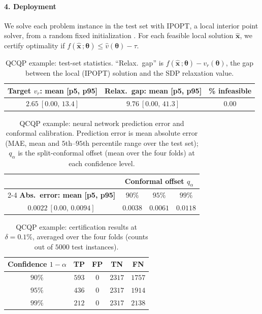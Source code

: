 \documentclass[10pt]{article} %
\theoremstyle{plain}
\theoremstyle{definition}
\theoremstyle{remark}
\begin{document}
\paragraph{4. Deployment}

We solve each problem instance in the test set with IPOPT, a local interior point solver, from a random fixed initialization \citep{wachter2006implementation}. For each feasible local solution $\hat{\mathbf{x}}$, we certify optimality if $f(\hat{\mathbf{x}}\,;\bm{\theta}) \leq \hat{v}(\bm{\theta}) - \tau$.

\begin{table}[H]
\centering
\caption{QCQP example: test-set statistics. ``Relax.\ gap'' is $f(\hat{\mathbf{x}}\,;\bm{\theta}) - v_r(\bm{\theta})$, the gap between the local (IPOPT) solution and the SDP relaxation value.}
\begin{tabular}{ccc}
\toprule
\textbf{Target } $v_r$\textbf{: mean [p5, p95]} & \textbf{Relax.\ gap: mean [p5, p95]} & \textbf{\% infeasible} \\
\midrule
$2.65\ [0.00,\,13.4]$ & $9.76\ [0.00,\,41.3]$ & $0.00$ \\
\bottomrule
\end{tabular}
\label{tab:QCQP-data}
\end{table}

\begin{table}[H]
\centering
\caption{QCQP example: neural network prediction error and conformal calibration. Prediction error is mean absolute error (MAE, mean and $5$th--$95$th percentile range over the test set); $q_\alpha$ is the split-conformal offset (mean over the four folds) at each confidence level.}
\begin{tabular}{c ccc}
\toprule
& \multicolumn{3}{c}{\textbf{Conformal offset } $q_\alpha$} \\
\cmidrule(lr){2-4}
\textbf{Abs.\ error: mean [p5, p95]} & $90\%$ & $95\%$ & $99\%$ \\
\midrule
$0.0022\ [0.00,\,0.0094]$ & $0.0038$ & $0.0061$ & $0.0118$ \\
\bottomrule
\end{tabular}
\label{tab:QCQP-error}
\end{table}

\begin{table}[H]
\centering
\caption{QCQP example: certification results at $\delta = 0.1\%$, averaged over the four folds (counts out of $5000$ test instances).}
\begin{tabular}{c cccc}
\toprule
\textbf{Confidence } $1-\alpha$ & \textbf{TP} & \textbf{FP} & \textbf{TN} & \textbf{FN} \\
\midrule
$90\%$ & $593$ & $0$ & $2317$ & $1757$ \\
$95\%$ & $436$ & $0$ & $2317$ & $1914$ \\
$99\%$ & $212$ & $0$ & $2317$ & $2138$ \\
\bottomrule
\end{tabular}
\label{tab:QCQP-cert}
\end{table}
\end{document}
